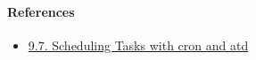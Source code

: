 \documentclass[12pt, a4paper]{article}
\begin{document}
  \paragraph{References}
  \begin{itemize}
    \item \href{https://debian-handbook.info/browse/en-US/stable/sect.task-scheduling-cron-atd.html}{9.7. Scheduling Tasks with cron and atd}
  \end{itemize}
\end{document}
